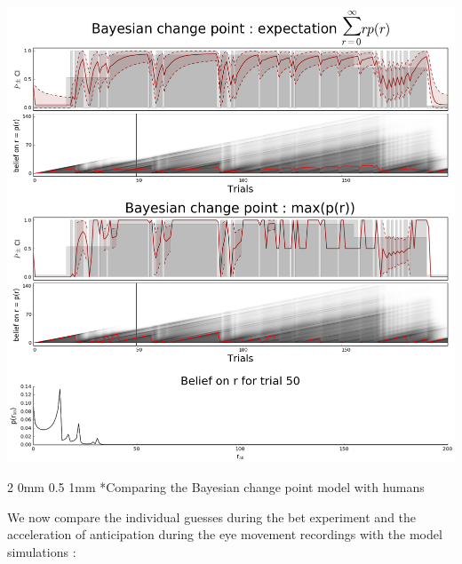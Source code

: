 \documentclass[profile,final,english, draft]{article}%
\makeatletter
\renewcommand{\subsection}{\@startsection
        {subsection}%
        {2}%
        {0mm}%
        {0.5\baselineskip}%
        {1mm}%
        {\normalsize\color[rgb]{0.4,0,0}\bfseries}}%
\makeatother
\begin{document}
\begin{multicols}{3}
\begin{center} 
    \includegraphics[width=1\columnwidth]{bayesianchangepoint}
\end{center}




\subsection*{Comparing the Bayesian change point model with humans}

We now compare the individual guesses during the bet experiment and the acceleration of anticipation during the eye movement recordings with the model simulations :


\end{multicols}
\end{document}
